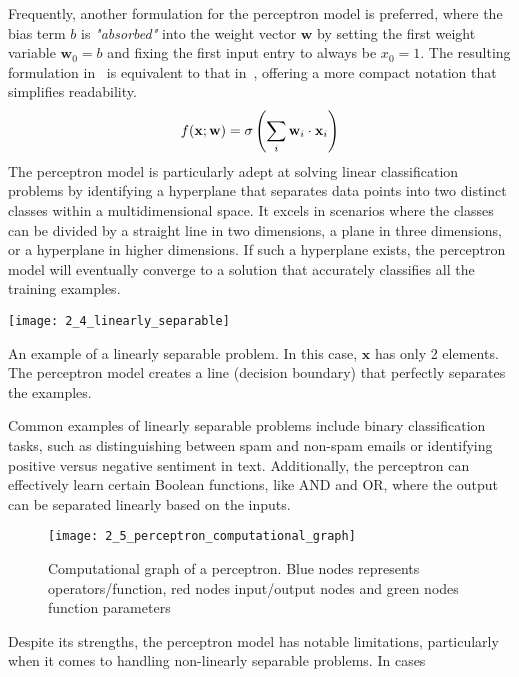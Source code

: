 Frequently, another formulation for the perceptron model is preferred, where the
bias term $b$ is \emph{"absorbed"} into the weight vector $\mathbf{w}$ by
setting the first weight variable $\mathbf{w}_0 = b$ and fixing the first input
entry to always be $x_0 = 1$. The resulting formulation in~
is equivalent to that in~, offering a more compact notation that
simplifies readability.
\begin{equation}
    \labeq{2_14}
    \begin{split}
    f(\mathbf{x}; \mathbf{w}) &= \sigma \left( \sum_{i} \mathbf{w}_i \cdot \mathbf{x}_i \right)\\
    \end{split}
\end{equation}
The perceptron model is particularly adept at solving linear classification
problems by identifying a hyperplane that separates data points into two
distinct classes within a multidimensional space. It excels in scenarios where
the classes can be divided by a straight line in two dimensions, a plane in
three dimensions, or a hyperplane in higher dimensions. If such a hyperplane
exists, the perceptron model will eventually converge to a solution that
accurately classifies all the training examples.
\begin{marginfigure}[*-8]
  \texttt{[image: 2\_4\_linearly\_separable]}
  \caption[Linearly Separable Problem]{
  An example of a linearly separable problem. In this case, $\mathbf{x}$ has
  only 2 elements. The perceptron model creates a line (decision boundary) that
  perfectly separates the examples.
  }
\end{marginfigure}
Common examples of linearly separable problems include binary classification
tasks, such as distinguishing between spam and non-spam emails or identifying
positive versus negative sentiment in text. Additionally, the perceptron can
effectively learn certain Boolean functions, like AND and OR, where the output
can be separated linearly based on the inputs.
\begin{figure}[h]
  \texttt{[image: 2\_5\_perceptron\_computational\_graph]}
  \caption[Perceptron Computational Graph]{
      Computational graph of a perceptron. Blue nodes represents
      operators/function, red nodes input/output nodes and green nodes function
      parameters
  }
\end{figure}
Despite its strengths, the perceptron model has notable limitations,
particularly when it comes to handling non-linearly separable problems. In cases
